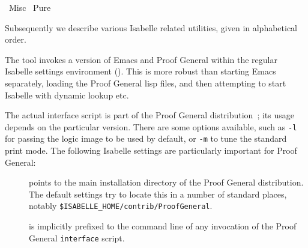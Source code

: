 %
\begin{isabellebody}%
\def\isabellecontext{Misc}%
%
\isadelimtheory
\isanewline
\isanewline
%
\endisadelimtheory
%
\isatagtheory
{}\isamarkupfalse%
\ Misc\isanewline
{}\ Pure\isanewline
{}%
\endisatagtheory
{\isafoldtheory}%
%
\isadelimtheory
%
\endisadelimtheory
%
\isamarkuptrue%
%
\begin{isamarkuptext}%
Subsequently we describe various Isabelle related utilities, given
  in alphabetical order.%
\end{isamarkuptext}%
\isamarkuptrue%
%
\isamarkuptrue%
%
\begin{isamarkuptext}%
The \hypertarget{tool.emacs}{\hyperlink{tool.emacs}{\mbox{}}} tool invokes a version of Emacs and Proof
  General within the regular Isabelle settings environment
  ().  This is more robust than starting Emacs
  separately, loading the Proof General lisp files, and then
  attempting to start Isabelle with dynamic \hyperlink{setting.PATH}{\mbox{}} lookup
  etc.

  The actual interface script is part of the Proof General
  distribution~\cite{proofgeneral}; its usage depends on the
  particular version.  There are some options available, such as
  \verb|-l| for passing the logic image to be used by default,
  or \verb|-m| to tune the standard print mode.  The following
  Isabelle settings are particularly important for Proof General:

  \begin{description}

  \item[\hypertarget{setting.PROOFGENERAL-HOME}{\hyperlink{setting.PROOFGENERAL-HOME}{\mbox{}}}] points to the main
  installation directory of the Proof General distribution.  The
  default settings try to locate this in a number of standard places,
  notably \verb|$ISABELLE_HOME/contrib/ProofGeneral|.

  \item[\hypertarget{setting.PROOFGENERAL-OPTIONS}{\hyperlink{setting.PROOFGENERAL-OPTIONS}{\mbox{}}}] is implicitly prefixed to
  the command line of any invocation of the Proof General \verb|interface| script.


\end{description}
\end{isamarkuptext}
\end{isabellebody}
